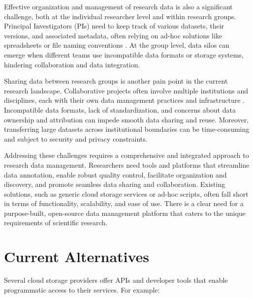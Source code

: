 \documentclass[conference]{IEEEtran}
\begin{document}
Effective organization and management of research data is also a significant challenge, both at the individual researcher level and within research groups. Principal Investigators (PIs) need to keep track of various datasets, their versions, and associated metadata, often relying on ad-hoc solutions like spreadsheets or file naming conventions \cite{kowalczyk2018data}. At the group level, data silos can emerge when different teams use incompatible data formats or storage systems, hindering collaboration and data integration.

Sharing data between research groups is another pain point in the current research landscape. Collaborative projects often involve multiple institutions and disciplines, each with their own data management practices and infrastructure \cite{tenopir2011data}. Incompatible data formats, lack of standardization, and concerns about data ownership and attribution can impede smooth data sharing and reuse. Moreover, transferring large datasets across institutional boundaries can be time-consuming and subject to security and privacy constraints.

Addressing these challenges requires a comprehensive and integrated approach to research data management. Researchers need tools and platforms that streamline data annotation, enable robust quality control, facilitate organization and discovery, and promote seamless data sharing and collaboration. Existing solutions, such as generic cloud storage services or ad-hoc scripts, often fall short in terms of functionality, scalability, and ease of use. There is a clear need for a purpose-built, open-source data management platform that caters to the unique requirements of scientific research.

\section{Current Alternatives}
Several cloud storage providers offer APIs and developer tools that enable programmatic access to their services. For example:
\end{document}
